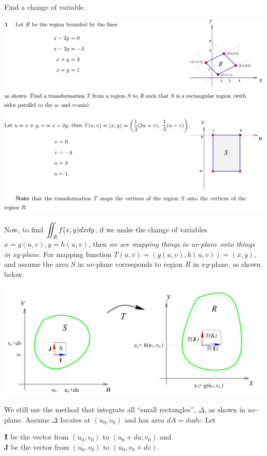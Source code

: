 \begin{spacing}{1.3}
    \newpage
    \eg Find a change of variable.

    \includegraphics[scale=0.25]{images/Ch14-change-var-eg.jpeg}

    \newpage
    Now, to find $\displaystyle \iint_R f(x,y) dxdy$, if we make the change of variables $x=g(u,v), y=h(u,v)$,
    then {\it we are mapping things in uv-plane onto things in xy-plane}. For mapping function 
    $T(u,v)=(g(u,v), h(u,v))=(x,y)$, and assume the area $S$ in $uv$-plane corresponds 
    to region $R$ in $xy$-plane, as shown below.

    \begin{center}
        \includegraphics[scale=0.33]{images/Ch14-jacobian-mapping.jpeg}
    \end{center}

    We still use the method that integrate all ``small rectangles'', $\Delta$, as shown in $uv$-plane.
    Assume $\Delta$ locates at $(u_0,v_0)$ and has area $dA=dudv$. Let

    $\bf I$ be the vector from $\left(u_{0}, v_{0}\right)$ to $\left(u_{0}+d u, v_{0}\right)$ and\\
    $\mathbf{J}$ be the vector from $\left(u_{0}, v_{0}\right)$ to $\left(u_{0}, v_{0}+d v\right)$. 
    

\end{spacing}
